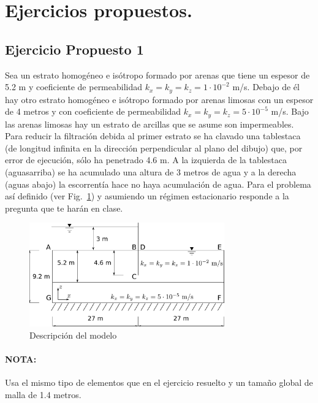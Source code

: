 \section{Ejercicios propuestos.}

\subsection{Ejercicio Propuesto 1}

Sea un estrato homogéneo e isótropo formado por arenas que tiene un
espesor de 5.2 m y coeficiente de permeabilidad
$k_x=k_y=k_z=1\cdot10^{-2}$ m/s. Debajo de él hay otro estrato
homogéneo e isótropo formado por arenas limosas con un espesor de 4
metros y con coeficiente de permeabilidad $k_x=k_y=k_z=5\cdot10^{-5}$
m/s. Bajo las arenas limosas hay un estrato de arcillas que se asume
son impermeables. Para reducir la filtración debida al primer estrato
se ha clavado una tablestaca (de longitud infinita en la dirección
perpendicular al plano del dibujo) que, por error de ejecución, sólo
ha penetrado 4.6 m. A la izquierda de la tablestaca (aguasarriba) se
ha acumulado una altura de 3 metros de agua y a la derecha (aguas
abajo) la escorrentía hace no haya acumulación de agua. Para el
problema así definido (ver Fig.~\ref{enu02}) y asumiendo un régimen
estacionario responde a la pregunta que te harán en clase.
\begin{figure}[!h]
  \begin{center}
    \includegraphics[width=0.75\textwidth]{./body/images/enu02}
  \end{center}
  \caption{Descripción del modelo}
  \label{enu02}
\end{figure}



\paragraph{NOTA:} Usa el mismo tipo de elementos que en el ejercicio resuelto y un tamaño global de malla de 1.4 metros.

